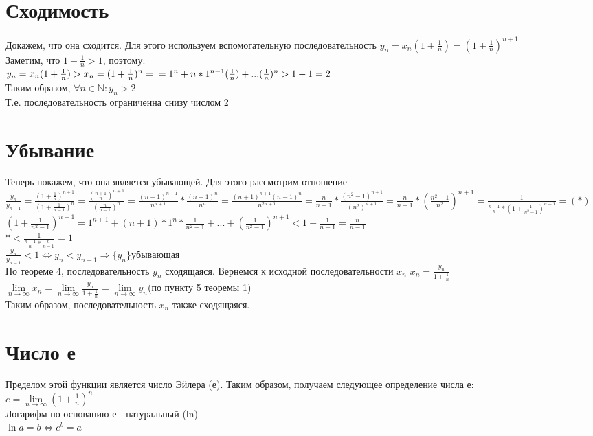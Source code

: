 \documentclass[oneside]{book}
\begin{document}
\begin{enumerate}
\section{Сходимость}
Докажем, что она сходится. Для этого используем вспомогательную последовательность
$y_n=x_n(1+\frac{1}{n})=(1+\frac{1}{n})^{n+1}$\\
Заметим, что $1+\frac{1}{n}>1$, поэтому:\\ $y_n=x_n(1+\frac{1}{n})>x_n=(1+\frac{1}{n})^n=\\=1^n+n*1^{n-1}(\frac{1}{n})+...(\frac{1}{n})^n>1+1=2$
\\Таким образом, $\forall n \in \mathbb{N} :y_n>2$
\\Т.е. последовательность ограниченна снизу числом 2
\section{Убывание}
Теперь покажем, что она является убывающей. Для этого рассмотрим отношение
$\frac{y_n}{y_{n-1}}=\frac{(1+\frac{1}{n})^{n+1}}{(1+\frac{1}{n-1})^n}=\frac{(\frac{n+1}{n})^{n+1}}{(\frac{n}{n-1})^n}=\frac{(n+1)^{n+1}}{n^{n+1}}*\frac{(n-1)^n}{n^n}=\frac{(n+1)^{n+1}(n-1)^{n}}{n^{2n+1}}=\frac{n}{n-1}*\frac{(n^2-1)^{n+1}}{(n^2)^{n+1}}=\frac{n}{n-1}*(\frac{n^2-1}{n^2})^{n+1}=\frac{1}{\frac{n-1}{n}*(1+\frac{1}{n^2-1})^{n+1}}=(*)$\\
$(1+\frac{1}{n^2-1})^{n+1}=1^{n+1}+(n+1)*1^n*\frac{1}{n^2-1}+...+(\frac{1}{n^2-1})^{n+1}<1+\frac{1}{n-1}=\frac{n}{n-1}$\\
$*<\frac{1}{\frac{n-1}{n}*\frac{n}{n-1}}=1$
\\$\frac{y_n}{y_{n-1}}<1\Leftrightarrow y_n<y_{n-1} \Rightarrow \{y_n\} убывающая$
\\По теореме 4, последовательность $y_n$ сходящаяся. Вернемся к исходной последовательности $x_n$
$x_n=\frac{y_n}{1+\frac{1}{n}}$\\
$\lim \limits_{n\rightarrow \infty}x_n=\lim \limits_{n\rightarrow \infty}\frac{y_n}{1+\frac{1}{n}}=\lim \limits_{n\rightarrow \infty}y_n$(по пункту 5 теоремы 1)\\
Таким образом, последовательность $x_n$ также сходящаяся.
\section{Число е}
Пределом этой функции является число Эйлера (е).
Таким образом, получаем следующее определение числа е:\\
$e=\lim \limits_{n\rightarrow \infty}(1+\frac{1}{n})^n$
\\Логарифм по основанию е - натуральный (ln)\\
$\ln a = b \Leftrightarrow e^b=a$

\end{enumerate}
\end{document}
